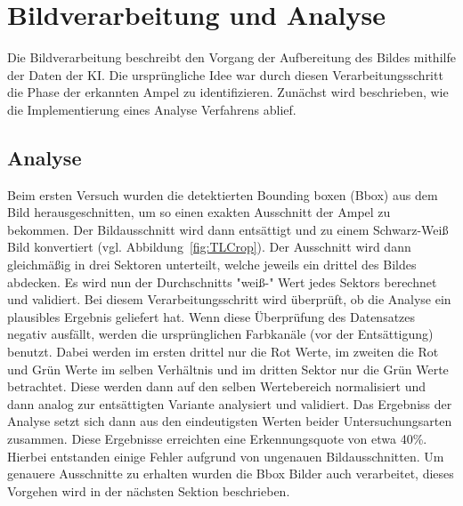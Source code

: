 \documentclass[a4paper,oneside,12pt]{report}
\begin{document}
	\chapter{Bildverarbeitung und Analyse}
	\begin{onehalfspace}
		Die Bildverarbeitung beschreibt den Vorgang der Aufbereitung des Bildes mithilfe der Daten der KI. Die ursprüngliche Idee war durch diesen Verarbeitungsschritt die Phase der erkannten Ampel zu identifizieren. Zunächst wird beschrieben, wie die Implementierung eines Analyse Verfahrens ablief. 
		\section{Analyse}
		Beim ersten Versuch wurden die detektierten Bounding boxen (Bbox) aus dem Bild herausgeschnitten, um so einen exakten Ausschnitt der Ampel zu bekommen. Der Bildausschnitt wird dann entsättigt und zu einem Schwarz-Weiß Bild konvertiert (vgl. Abbildung~\ref{fig:TLCrop}). Der Ausschnitt wird dann gleichmäßig in drei Sektoren unterteilt, welche jeweils ein drittel des Bildes abdecken. Es wird nun der Durchschnitts "weiß-" Wert jedes Sektors berechnet und validiert. Bei diesem Verarbeitungsschritt wird überprüft, ob die Analyse ein plausibles Ergebnis geliefert hat. Wenn diese Überprüfung des Datensatzes negativ ausfällt, werden die ursprünglichen Farbkanäle (vor der Entsättigung) benutzt. Dabei werden im ersten drittel nur die Rot Werte, im zweiten die Rot und Grün Werte im selben Verhältnis und im dritten Sektor nur die Grün Werte betrachtet. Diese werden dann auf den selben Wertebereich normalisiert und dann analog zur entsättigten Variante analysiert und validiert. Das Ergebniss der Analyse setzt sich dann aus den eindeutigsten Werten beider Untersuchungsarten zusammen. \newline
		Diese Ergebnisse erreichten eine Erkennungsquote von etwa 40\%. Hierbei entstanden einige Fehler aufgrund von ungenauen Bildausschnitten. Um genauere Ausschnitte zu erhalten wurden die Bbox Bilder auch verarbeitet, dieses Vorgehen wird in der nächsten Sektion beschrieben.

\end{onehalfspace}
\end{document}
